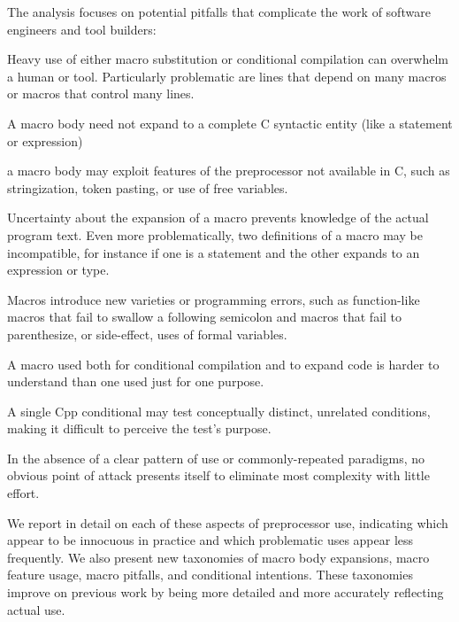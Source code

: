 \documentclass[10pt]{article}
\begin{document}
The analysis focuses on potential pitfalls that complicate the work of
software engineers and tool builders:
\begin{description}\itemsep 0pt \parskip 0pt
\item[high total use]  Heavy use of either macro substitution or
  conditional compilation can overwhelm a human or tool.  Particularly
  problematic are lines that depend on many macros or macros that control
  many lines.
\item[complicated bodies]  A macro body need not expand to a complete
  C syntactic entity (like a statement or expression)
\item[extra-linguistic features]  a macro body may exploit features of
  the preprocessor not available in C, such as stringization, token
  pasting, or use of free variables.
\item[multiple definitions]  Uncertainty about the expansion of a macro
  prevents knowledge of the actual program text.  Even more problematically,
  two definitions of a macro may be incompatible, for instance if one is a
  statement and the other expands to an expression or type.
\item[macro pitfalls]  Macros introduce new varieties or programming
  errors, such as function-like macros that fail to swallow a following
  semicolon and macros that fail to parenthesize, or side-effect, uses of
  formal variables.
\item[inconsistent usage]  A macro used both for conditional
  compilation and to expand code is harder to understand than one used just
  for one purpose.
\item[mixed tests]  A single Cpp conditional may test conceptually
  distinct, unrelated conditions, making it difficult to perceive the
  test's purpose.
\item[variation in use]  In the absence of a clear pattern of use or
  commonly-repeated paradigms, no obvious point of attack presents itself
  to eliminate most complexity with little effort.
\end{description}

We report in detail on each of these aspects of preprocessor use,
indicating which appear to be innocuous in practice and which problematic
uses appear less frequently.  We also present new taxonomies of macro body
expansions, macro feature usage, macro pitfalls, and conditional
intentions.  These taxonomies improve on previous work by being more
detailed and more accurately reflecting actual use.
\end{document}
